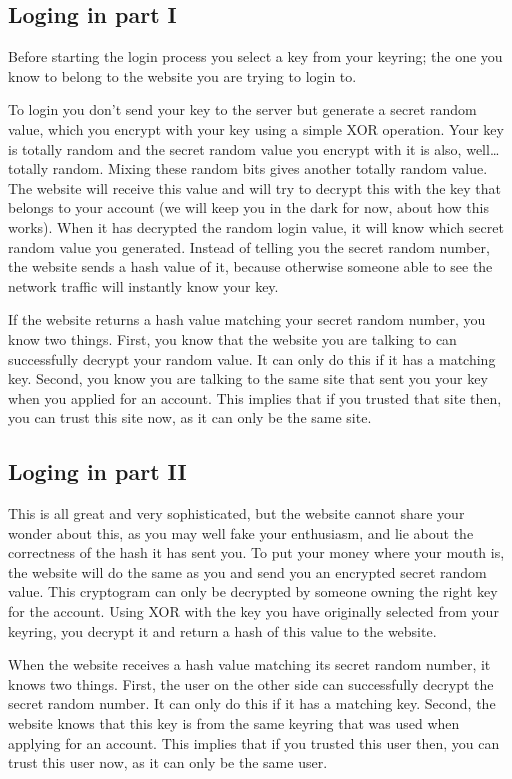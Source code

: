 \subsection{Loging in part I}
Before starting the login process you select a key from your keyring;
the one you know to belong to the website you are trying to login to.
\par
To login you don't send your key to the server but generate a secret random value,
which you encrypt with your key using a simple XOR operation.
Your key is totally random and the secret random value you encrypt with it is also, well\ldots totally random.
Mixing these random bits gives another totally random value.
The website will receive this value and will try to decrypt this with the key that belongs to your account
(we will keep you in the dark for now, about how this works).
When it has decrypted the random login value,
it will know which secret random value you generated.
Instead of telling you the secret random number,
the website sends a hash value of it,
because otherwise someone able to see the network traffic will instantly know your key.
\par
If the website returns a hash value matching your secret random number, you know two things.
First, you know that the website you are talking to can successfully decrypt your random value.
It can only do this if it has a matching key.
Second, you know you are talking to the same site that sent you your key when you applied for an account.
This implies that if you trusted that site then, you can trust this site now, as it can only be the same site.
\par
\subsection{Loging in part II}
This is all great and very sophisticated, but the website cannot share your wonder about this,
as you may well fake your enthusiasm, and lie about the correctness of the hash it has sent you.
To put your money where your mouth is,
the website will do the same as you and send you an encrypted secret random value.
This cryptogram can only be decrypted by someone owning the right key for the account.
Using XOR with the key you have originally selected from your keyring,
you decrypt it and return a hash of this value to the website.
\par
When the website receives a hash value matching its secret random number, it knows two things.
First, the user on the other side can successfully decrypt the secret random number.
It can only do this if it has a matching key.
Second, the website knows that this key is from the same keyring that was used when applying for an account.
This implies that if you trusted this user then, you can trust this user now, as it can only be the same user.
